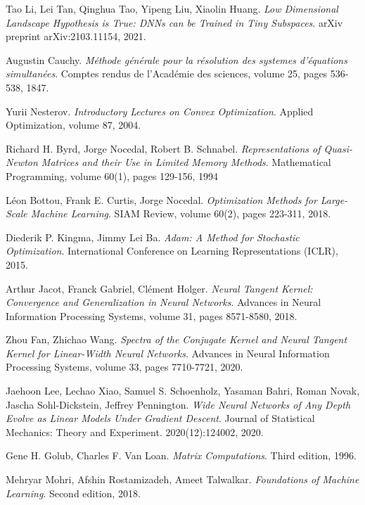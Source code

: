 \documentclass[11pt, a4paper]{article}
\begin{document}
\pagebreak
\begin{thebibliography}{999}

 Tao Li, Lei Tan, Qinghua Tao, Yipeng Liu, Xiaolin Huang. \textit{Low Dimensional Landscape Hypothesis is True: DNNs can be Trained in Tiny Subspaces}. arXiv preprint arXiv:2103.11154, 2021.

 Augustin Cauchy. \textit{M\'{e}thode g\'{e}n\'{e}rale pour la r\'{e}solution des systemes d'\'{e}quations simultan\'{e}es}. Comptes rendus de l'Acad\'{e}mie des sciences, volume 25, pages 536-538, 1847.

 Yurii Nesterov. \textit{Introductory Lectures on Convex Optimization}. Applied Optimization, volume 87, 2004.

 Richard H. Byrd, Jorge Nocedal, Robert B. Schnabel. \textit{Representations of Quasi-Newton Matrices and their Use in Limited Memory Methods}. Mathematical Programming, volume 60(1), pages 129-156, 1994 

 L\'{e}on Bottou, Frank E. Curtis, Jorge Nocedal. \textit{Optimization Methods for Large-Scale Machine Learning}. SIAM Review, volume 60(2), pages 223-311, 2018.

 Diederik P. Kingma, Jimmy Lei Ba. \textit{Adam: A Method for Stochastic Optimization}. International Conference on Learning Representations (ICLR), 2015.

 Arthur Jacot, Franck Gabriel, Cl\'{e}ment Holger. \textit{Neural Tangent Kernel: Convergence and Generalization in Neural Networks}. Advances in Neural Information Processing Systems, volume 31, pages 8571-8580, 2018.

 Zhou Fan, Zhichao Wang. \textit{Spectra of the Conjugate Kernel and Neural Tangent Kernel for Linear-Width Neural Networks}. Advances in Neural Information Processing Systems, volume 33, pages 7710-7721, 2020.

 Jaehoon Lee, Lechao Xiao, Samuel S. Schoenholz, Yasaman Bahri, Roman Novak, Jascha Sohl-Dickstein, Jeffrey Pennington. \textit{Wide Neural Networks of Any Depth Evolve as Linear Models Under Gradient Descent}. Journal of Statistical Mechanics: Theory and Experiment. 2020(12):124002, 2020.

 Gene H. Golub, Charles F. Van Loan. \textit{Matrix Computations}. Third edition, 1996.

 Mehryar Mohri, Afshin Rostamizadeh, Ameet Talwalkar. \textit{Foundations of Machine Learning}. Second edition, 2018.

\end{thebibliography}
\end{document}
